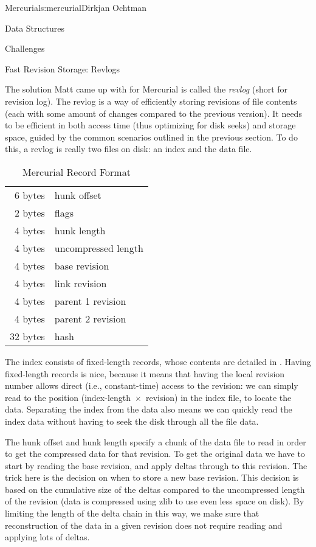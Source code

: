 \begin{aosachapter}{Mercurial}{s:mercurial}{Dirkjan Ochtman}
\begin{aosasect1}{Data Structures}
\begin{aosasect2}{Challenges}
\end{aosasect2}

\begin{aosasect2}{Fast Revision Storage: Revlogs}

The solution Matt came up with for Mercurial is called the \emph{revlog}
(short for revision log). The revlog is a way of efficiently storing
revisions of file contents (each with some amount of changes compared
to the previous version). It needs to be efficient in both access time
(thus optimizing for disk seeks) and storage space, guided by the common
scenarios outlined in the previous section. To do this, a revlog is
really two files on disk: an index and the data file.

\begin{table}[h!]
  \centering
  \begin{tabular}{|rl|}
    \hline
    6 bytes & hunk offset \\
    2 bytes & flags \\
    4 bytes & hunk length \\
    4 bytes & uncompressed length \\
    4 bytes & base revision \\
    4 bytes & link revision \\
    4 bytes & parent 1 revision \\
    4 bytes & parent 2 revision \\
    32 bytes & hash \\
    \hline
  \end{tabular}
  \caption{Mercurial Record Format}
  \label{tbl.hg.records}
\end{table}

The index consists of fixed-length records, whose contents are
detailed in . Having fixed-length records
is nice, because it means that having the local revision number allows
direct (i.e., constant-time) access to the revision: we can simply
read to the position (index-length~$\times$~revision) in the index
file, to locate the data. Separating the index from the data also
means we can quickly read the index data without having to seek the
disk through all the file data.

The hunk offset and hunk length specify a chunk of the data file to
read in order to get the compressed data for that revision. To get the
original data we have to start by reading the base revision, and apply
deltas through to this revision. The trick here is the decision on
when to store a new base revision. This decision is based on the
cumulative size of the deltas compared to the uncompressed length of
the revision (data is compressed using zlib to use even less space on
disk). By limiting the length of the delta chain in this way, we make
sure that reconstruction of the data in a given revision does not
require reading and applying lots of deltas.


\end{aosasect2}
\end{aosasect1}
\end{aosachapter}
